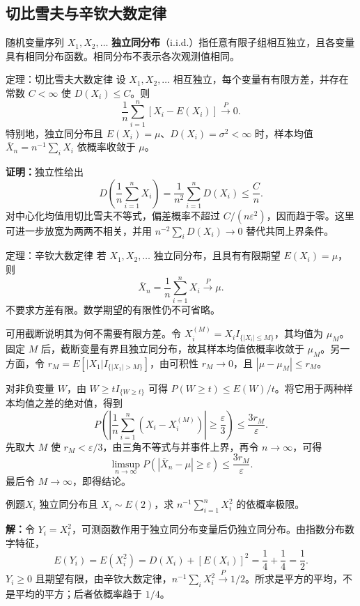 \documentclass[UTF8,fontset=none,zihao=-4,a4paper]{ctexart}
\newcommand{\term}[1]{\textbf{#1}}
\newcommand{\example}[1]{\begin{infobox}{例题}#1\end{infobox}}
\newcommand{\solution}{\par\noindent\textbf{解：}}
\newcommand{\proof}{\par\noindent\textbf{证明：}}
\begin{document}
\subsection{切比雪夫与辛钦大数定律}
随机变量序列 $X_1,X_2,\ldots$ \term{独立同分布}（i.i.d.）指任意有限子组相互独立，且各变量具有相同分布函数。相同分布不表示各次观测值相同。
\begin{infobox}{定理：切比雪夫大数定律}
设 $X_1,X_2,\ldots$ 相互独立，每个变量有有限方差，并存在常数 $C<\infty$ 使 $D(X_i)\le C$。则
\[
\frac1n\sum_{i=1}^n[X_i-E(X_i)]\xrightarrow{P}0.
\]
特别地，独立同分布且 $E(X_i)=\mu$、$D(X_i)=\sigma^2<\infty$ 时，样本均值 $\overline X_n=n^{-1}\sum_iX_i$ 依概率收敛于 $\mu$。
\end{infobox}
\proof 独立性给出
\[
D\left(\frac1n\sum_{i=1}^nX_i\right)
=\frac1{n^2}\sum_{i=1}^nD(X_i)\le\frac Cn.
\]
对中心化均值用切比雪夫不等式，偏差概率不超过 $C/(n\varepsilon^2)$，因而趋于零。这里可进一步放宽为两两不相关，并用 $n^{-2}\sum_iD(X_i)\to0$ 替代共同上界条件。
\begin{infobox}{定理：辛钦大数定律}
若 $X_1,X_2,\ldots$ 独立同分布，且具有有限期望 $E(X_i)=\mu$，则
\[
\overline X_n=\frac1n\sum_{i=1}^nX_i\xrightarrow{P}\mu.
\]
不要求方差有限。数学期望的有限性仍不可省略。
\end{infobox}
可用截断说明其为何不需要有限方差。令 $X_i^{(M)}=X_iI_{\{|X_i|\le M\}}$，其均值为 $\mu_M$。固定 $M$ 后，截断变量有界且独立同分布，故其样本均值依概率收敛于 $\mu_M$。另一方面，令 $r_M=E[|X_1|I_{\{|X_1|>M\}}]$，由可积性 $r_M\to0$，且 $|\mu-\mu_M|\le r_M$。

对非负变量 $W$，由 $W\ge tI_{\{W\ge t\}}$ 可得 $P(W\ge t)\le E(W)/t$。将它用于两种样本均值之差的绝对值，得到
\[
P\left(\left|\frac1n\sum_{i=1}^n(X_i-X_i^{(M)})\right|\ge\frac\varepsilon3\right)
\le\frac{3r_M}{\varepsilon}.
\]
先取大 $M$ 使 $r_M<\varepsilon/3$，由三角不等式与并事件上界，再令 $n\to\infty$，可得
\[
\limsup_{n\to\infty}P(|\overline X_n-\mu|\ge\varepsilon)\le\frac{3r_M}{\varepsilon}.
\]
最后令 $M\to\infty$，即得结论。
\example{$X_i$ 独立同分布且 $X_i\sim E(2)$，求 $n^{-1}\sum_{i=1}^nX_i^2$ 的依概率极限。}
\solution 令 $Y_i=X_i^2$，可测函数作用于独立同分布变量后仍独立同分布。由指数分布数字特征，
\[
E(Y_i)=E(X_i^2)=D(X_i)+[E(X_i)]^2
=\frac14+\frac14=\frac12.
\]
$Y_i\ge0$ 且期望有限，由辛钦大数定律，$n^{-1}\sum_iX_i^2\xrightarrow{P}1/2$。所求是平方的平均，不是平均的平方；后者依概率趋于 $1/4$。
\end{document}
